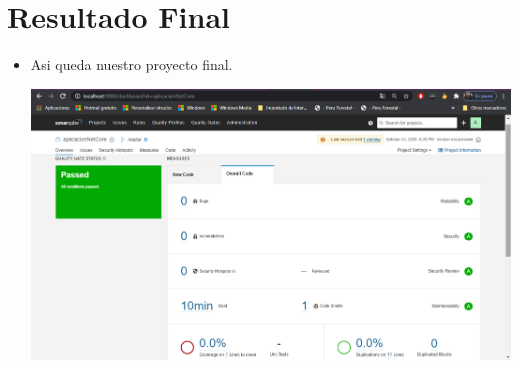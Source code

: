 \begin{center}
\end{center}

\section{ Resultado Final }
\begin{itemize}
    \item Asi queda nuestro proyecto final.
    \begin{center}

\includegraphics[width=\columnwidth]{images/17}\newline
\end{center}
\end{itemize}